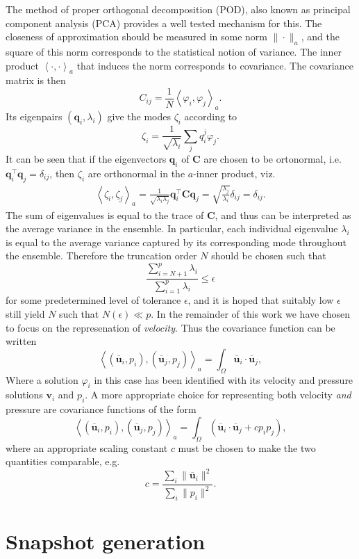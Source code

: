 \documentclass[3p,times,procedia]{elsarticle}
\begin{document}
The method of proper orthogonal decomposition (POD), also known as principal
component analysis (PCA) provides a well tested mechanism for this. The
closeness of approximation should be measured in some norm $\|\cdot\|_a$, and
the square of this norm corresponds to the statistical notion of variance. The
inner product $\left< \cdot, \cdot \right>_a$ that induces the norm corresponds
to covariance. The covariance matrix is then
\[
  C_{ij} = \frac{1}{N} \left< \varphi_i , \varphi_j \right>_a.
\]
Its eigenpairs $(\bm q_i, \lambda_i)$ give the modes $\zeta_i$ according to
\[
  \zeta_i = \frac{1}{\sqrt{\lambda_i}} \sum_j q_i^j \varphi_j.
\]
It can be seen that if the eigenvectors $\bm q_i$ of $\bm C$ are chosen to be
ortonormal, i.e.~$\bm q_i^\intercal \bm q_j = \delta_{ij}$, then $\zeta_i$ are
orthonormal in the $a$-inner product, viz.
\begin{align*}
  \left< \zeta_i , \zeta_j \right>_a
  = \frac{1}{\sqrt{\lambda_i \lambda_j}} \bm q_i^\intercal \bm C \bm q_j
  = \sqrt{\frac{\lambda_j}{\lambda_i}} \delta_{ij} = \delta_{ij}.
\end{align*}
The sum of eigenvalues is equal to the trace of $\bm C$, and thus can be
interpreted as the average variance in the ensemble. In particular, each
individual eigenvalue $\lambda_i$ is equal to the average variance captured by
its corresponding mode throughout the ensemble. Therefore the truncation order
$N$ should be chosen such that
\[
  \frac{\sum_{i=N+1}^{p} \lambda_i}{\sum_{i=1}^{p} \lambda_i} \leq \epsilon
\]
for some predetermined level of tolerance $\epsilon$, and it is hoped that
suitably low $\epsilon$ still yield $N$ such that $N(\epsilon) \ll p$. In the
remainder of this work we have chosen to focus on the represenation of
\emph{velocity}. Thus the covariance function can be written
\[
  \left< (\overline{\bm u}_i, p_i) , (\overline{\bm u}_j, p_j) \right>_a =
  \int_\Omega \overline{\bm u}_i \cdot \overline{\bm u}_j,
\]
Where a solution $\varphi_i$ in this case has been identified with its velocity
and pressure solutions $\bm v_i$ and $p_i$. A more appropriate choice for
representing both velocity \emph{and} pressure are covariance functions of the
form
\[
  \left< (\overline{\bm u}_i, p_i) , (\overline{\bm u}_j, p_j) \right>_a =
  \int_\Omega \left( \overline{\bm u}_i \cdot \overline{\bm u}_j + c p_i p_j \right),
\]
where an appropriate scaling constant $c$ must be chosen to make the two
quantities comparable, e.g.
\[
  c = \frac{\sum_i \| \overline{\bm u}_i \|^2}{\sum_i \| p_i \|^2}.
\]

\section{Snapshot generation}
\end{document}
